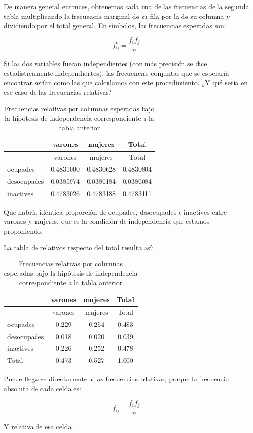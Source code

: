 \documentclass[]{book}
\begin{document}
De manera general entonces, obtenemos cada una de las frecuencias de la segunda tabla multiplicando la frecuencia marginal de su fila por la de su columna y dividiendo por el total general. En símbolos, las
frecuencias esperadas son:

\[f_{\text{ij}}^{e} = \frac{f_{i}f_{j}}{n}\]

Si las dos variables fueran independientes (con más precisión se dice
estadísticamente independientes), las frecuencias conjuntas que se
esperaría encontrar serían como las que calculamos con este
procedimiento. ¿Y qué sería en ese caso de las frecuencias relativas?

\begin{longtable}[]{@{}lccc@{}}
\caption{\label{tab:unnamed-chunk-124}Frecuencias relativas por columnas esperadas bajo la hipótesis de independencia correspondiente a la tabla anterior}\tabularnewline
\toprule
& varones & mujeres & Total\tabularnewline
\midrule
\endfirsthead
\toprule
& varones & mujeres & Total\tabularnewline
\midrule
\endhead
ocupades & 0.4831000 & 0.4830628 & 0.4830804\tabularnewline
desocupades & 0.0385974 & 0.0386184 & 0.0386084\tabularnewline
inactives & 0.4783026 & 0.4783188 & 0.4783111\tabularnewline
\bottomrule
\end{longtable}

Que habría idéntica proporción de ocupades, desocupades e inactives entre varones y mujeres, que es la condición de independencia que estamos proponiendo.

La tabla de relativos respecto del total resulta así:

\begin{longtable}[]{@{}lccc@{}}
\caption{\label{tab:unnamed-chunk-125}Frecuencias relativas por columnas esperadas bajo la hipótesis de independencia correspondiente a la tabla anterior}\tabularnewline
\toprule
& varones & mujeres & Total\tabularnewline
\midrule
\endfirsthead
\toprule
& varones & mujeres & Total\tabularnewline
\midrule
\endhead
ocupades & 0.229 & 0.254 & 0.483\tabularnewline
desocupades & 0.018 & 0.020 & 0.039\tabularnewline
inactives & 0.226 & 0.252 & 0.478\tabularnewline
Total & 0.473 & 0.527 & 1.000\tabularnewline
\bottomrule
\end{longtable}

Puede llegarse directamente a las frecuencias relativas, porque la
frecuencia absoluta de cada celda es:

\[f_{\text{ij}} = \frac{f_{i}f_{j}}{n}\]

Y relativa de esa celda:
\end{document}
